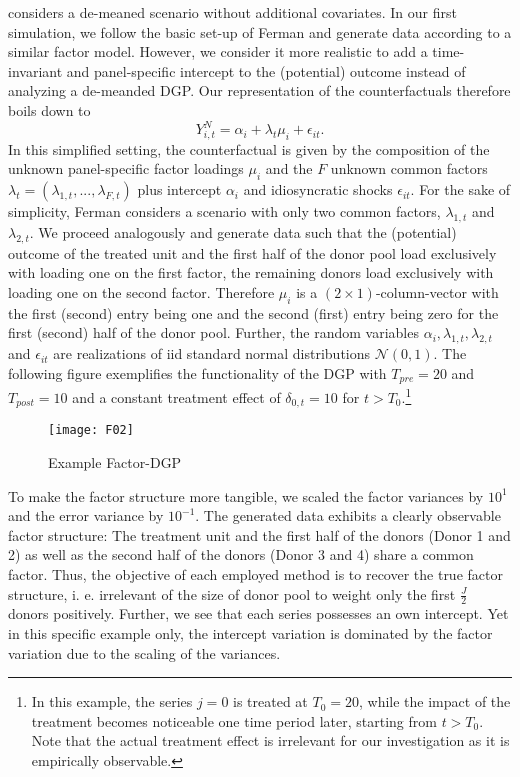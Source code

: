 \cite{ferman:2021} considers a de-meaned scenario without additional covariates. In our first simulation, we follow the basic set-up of Ferman and generate data according to a similar factor model. However, we consider it more realistic to add a time-invariant and panel-specific intercept to the (potential) outcome instead of analyzing a de-meanded \ac{DGP}. Our representation of the counterfactuals therefore boils down to 
\begin{equation*}
	Y_{i,t}^{N} = \alpha_i + \lambda_t \mu_i + \epsilon_{it}.
\end{equation*}
In this simplified setting, the counterfactual is given by the composition of the unknown panel-specific factor loadings $\mu_i$ and the $F$ unknown common factors $\lambda_t = (\lambda_{1,t}, ..., \lambda_{F,t})$ plus intercept $\alpha_i$ and idiosyncratic shocks $\epsilon_{it}$. For the sake of simplicity, Ferman considers a scenario with only two common factors, $\lambda_{1,t}$ and $\lambda_{2,t}$. We proceed analogously and generate data such that the (potential) outcome of the treated unit and the first half of the donor pool load exclusively with loading one on the first factor, the remaining donors load exclusively with loading one on the second factor. Therefore $\mu_i$ is a $(2 \times 1)$-column-vector with the first (second) entry being one and the second (first) entry being zero for the first (second) half of the donor pool. Further, the random variables $\alpha_i, \lambda_{1,t}, \lambda_{2,t}$ and $\epsilon_{it}$ are realizations of \ac{iid} standard normal distributions $\mathcal{N}(0,1)$. The following figure exemplifies the functionality of the \ac{DGP} with $T_{pre} = 20$ and $T_{post} = 10$ and a constant treatment effect of $\delta_{0,t} = 10$ for $t > T_0$.\footnote{In this example, the series $j = 0$ is treated at $T_0 = 20$, while the impact of the treatment becomes noticeable one time period later, starting from $t > T_0$. Note that the actual treatment effect is irrelevant for our investigation as it is empirically observable.}  
\begin{figure}[H]
	\centering
	\texttt{[image: F02]}
	\caption{Example Factor-\ac{DGP}}
	\label{F_02}
\end{figure}
To make the factor structure more tangible, we scaled the factor variances by $10^1$ and the error variance by $10^{-1}$. The generated data exhibits a clearly observable factor structure: The treatment unit and the first half of the donors (Donor 1 and 2) as well as the second half of the donors (Donor 3 and 4) share a common factor. Thus, the objective of each employed method is to recover the true factor structure, i. e. irrelevant of the size of donor pool to weight only the first $\frac{J}{2}$ donors positively. Further, we see that each series possesses an own intercept. Yet in this specific example only, the intercept variation is dominated by the factor variation due to the scaling of the variances.

